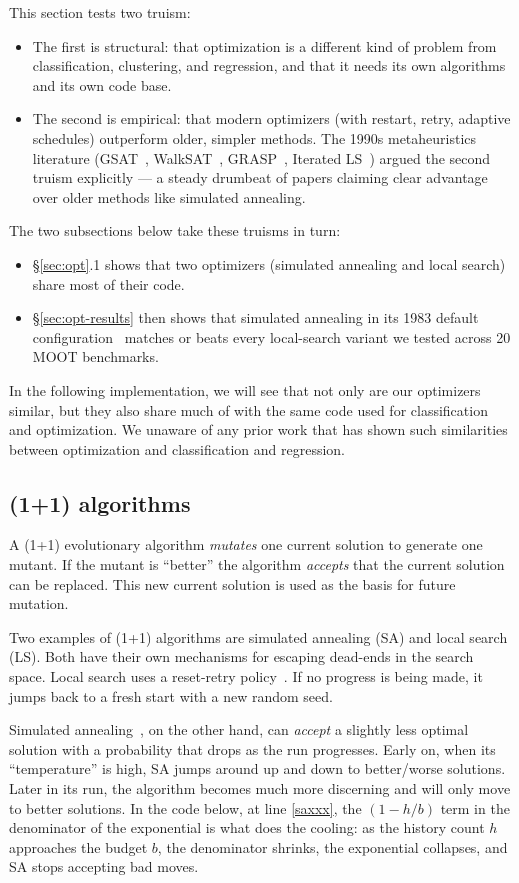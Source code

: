 \documentclass[AMA,STIX2COL]{WileyNJDv5}
\begin{document}
{This section tests two truism:
\begin{itemize}
\item The first is structural: that
optimization is a different kind of problem from classification,
clustering, and regression, and that it needs its own algorithms
and its own code base. 
\item The second is empirical: that modern
optimizers (with restart, retry, adaptive schedules) outperform
older, simpler methods. The 1990s metaheuristics literature
(GSAT~\cite{gsat}, WalkSAT~\cite{walksat}, GRASP~\cite{grasp},
Iterated LS~\cite{ils}) argued the second truism explicitly — a
steady drumbeat of papers claiming clear advantage over older
methods like simulated annealing. 
\end{itemize}
The two subsections below take
these truisms in turn:
\begin{itemize}
\item
\S\ref{sec:opt}.1 shows that two optimizers (simulated
annealing and local search) share most of their code.
\item
\S\ref{sec:opt-results} then shows that simulated annealing in
its 1983 default configuration~\cite{kirkpatrick1983optimization}
matches or beats every local-search variant we tested across 20
MOOT benchmarks.
\end{itemize}
In the following implementation,  we will see  that  not only are our optimizers similar, but
they also share much of
with the same code used for classification and optimization. 
We unaware of any prior work that has shown such similarities
between optimization and classification and regression.

\subsection{(1+1) algorithms}
A (1+1) evolutionary algorithm {\em mutates} one current solution
to generate one mutant. If the mutant is ``better'' the algorithm
{\em accepts} that the current solution can be replaced. This new
current solution is used as the basis for future mutation.

Two examples of (1+1) algorithms are simulated annealing (SA) and
local search (LS). Both have their own mechanisms for escaping
dead-ends in the search space. 
Local search uses  a reset-retry policy~\cite{Crawford:1994}.
If no progress is being made, it jumps back to a fresh start with a  new random seed.

Simulated annealing~\cite{kirkpatrick1983optimization}, on the other hand, can {\em accept}
a slightly less optimal solution with a probability that drops as
the run progresses. Early on, when its ``temperature'' is high, 
SA jumps around up and down to better/worse solutions.
Later in its run, the algorithm
becomes much more discerning and will only move to better solutions.  
In the code below,
at line \ref{saxxx}, the $(1-h/b)$ term in the
denominator of the exponential is what does the cooling: as the
history count $h$ approaches the budget $b$, the denominator
shrinks, the exponential collapses, and SA stops accepting bad
moves.


}
\end{document}
